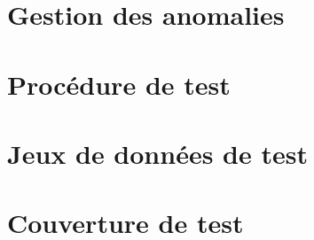 \chapter{Gestion des anomalies}

\chapter{Procédure de test}

\chapter{Jeux de données de test}

\chapter{Couverture de test}

